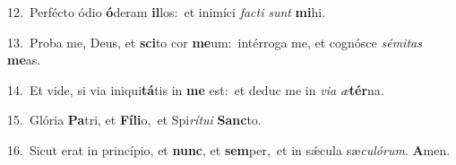 {\numbfont\textcolor{\numbcolor}{12.}}~Perfécto ódio \textbf{ó}\-deram \textbf{il}\-los:~\star et inimíci \textit{fac}\-\textit{ti} \textit{sunt} \textbf{mi}\-hi.\par
{\numbfont\textcolor{\numbcolor}{13.}}~Proba me, Deus, et \textbf{sci}\-to cor \textbf{me}\-um:~\star intérroga me, et cognósce \textit{sé}\-\textit{mi}\textit{tas} \textbf{me}\-as.\par
{\numbfont\textcolor{\numbcolor}{14.}}~Et vide, si via iniqui\-\textbf{tá}\-tis in \textbf{me} est:~\star et deduc me in \textit{vi}\-\textit{a} \textit{æ}\-\textbf{tér}na.\par
{\numbfont\textcolor{\numbcolor}{15.}}~Glória \textbf{Pa}\-tri, et \textbf{Fí}\-\textbf{li}o,~\star et Spi\-\textit{rí}\-\textit{tu}\textit{i} \textbf{Sanc}\-to.\par
{\numbfont\textcolor{\numbcolor}{16.}}~Sicut erat in princípio, et \textbf{nunc}\-, et \textbf{sem}\-per,~\star et in sǽcula sæ\-\textit{cu}\-\textit{ló}\textit{rum}. \textbf{A}\-men.\par

